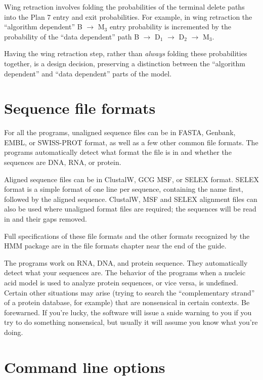 \documentclass[11pt]{report}
\begin{document}
Wing retraction involves folding the probabilities of the terminal
delete paths into the Plan 7 entry and exit probabilities. For
example, in wing retraction the ``algorithm dependent'' B
$\rightarrow$ M$_{3}$ entry probability is incremented by the
probability of the ``data dependent'' path B $\rightarrow$ D$_1$
$\rightarrow$ D$_2$ $\rightarrow$ M$_3$.

Having the wing retraction step, rather than {\em always} folding
these probabilities together, is a design decision, preserving a
distinction between the ``algorithm dependent'' and ``data dependent''
parts of the model.

\section{Sequence file formats}

For all the programs, unaligned sequence files can be in FASTA,
Genbank, EMBL, or SWISS-PROT format, as well as a few other common
file formats. The programs automatically detect what format the file
is in and whether the sequences are DNA, RNA, or protein.

Aligned sequence files can be in ClustalW, GCG MSF, or SELEX
format. SELEX format is a simple format of one line per sequence,
containing the name first, followed by the aligned sequence. ClustalW,
MSF and SELEX alignment files can also be used where unaligned format
files are required; the sequences will be read in and their gaps
removed. 

Full specifications of these file formats and the other formats
recognized by the HMM package are in the file formats chapter near the
end of the guide.

The programs work on RNA, DNA, and protein sequence. They
automatically detect what your sequences are. The behavior of the
programs when a nucleic acid model is used to analyze protein
sequences, or vice versa, is undefined. Certain other situations may
arise (trying to search the ``complementary strand'' of a protein
database, for example) that are nonsensical in certain contexts. Be
forewarned. If you're lucky, the software will issue a snide warning
to you if you try to do something nonsensical, but usually it will
assume you know what you're doing.

\section{Command line options}
\end{document}
